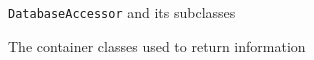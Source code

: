\begin{figure}[H]
\caption{\texttt{DatabaseAccessor} and its subclasses}
\label{fig:dat_dbac}
\end{figure}

\begin{figure}[H]
\caption{The container classes used to return information}
\label{fig:dat_containers}
\end{figure}